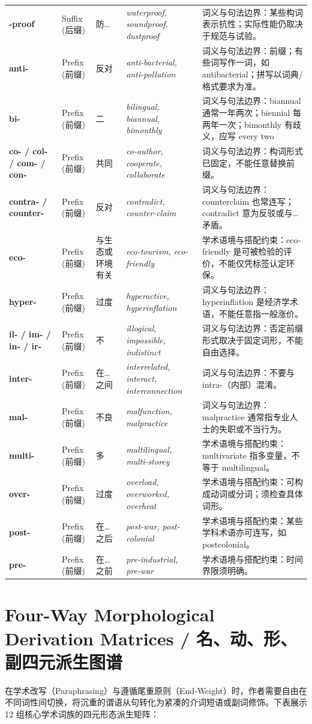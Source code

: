 \begin{longtable}{>{\raggedright\arraybackslash}p{2.2cm}>{\raggedright\arraybackslash}p{2.0cm}>{\raggedright\arraybackslash}p{3.2cm}>{\raggedright\arraybackslash}p{3.4cm}>{\raggedright\arraybackslash}p{3.4cm}}
\textbf{-proof} & Suffix (后缀) & 防… & \textit{waterproof, soundproof, dustproof} & 词义与句法边界：某些构词表示抗性；实际性能仍取决于规范与试验。 \tabularnewline
\textbf{anti-} & Prefix (前缀) & 反对 & \textit{anti-bacterial, anti-pollution} & 词义与句法边界：前缀；有些词写作一词，如 antibacterial；拼写以词典/格式要求为准。 \tabularnewline
\textbf{bi-} & Prefix (前缀) & 二 & \textit{bilingual, biannual, bimonthly} & 词义与句法边界：biannual 通常一年两次；biennial 每两年一次；bimonthly 有歧义，应写 every two \tabularnewline
\textbf{co- / col- / com- / con-} & Prefix (前缀) & 共同 & \textit{co-author, cooperate, collaborate} & 词义与句法边界：构词形式已固定，不能任意替换前缀。 \tabularnewline
\textbf{contra- / counter-} & Prefix (前缀) & 反对 & \textit{contradict, counter-claim} & 词义与句法边界：counterclaim 也常连写；contradict 意为反驳或与…矛盾。 \tabularnewline
\textbf{eco-} & Prefix (前缀) & 与生态或环境有关 & \textit{eco-tourism, eco-friendly} & 学术语境与搭配约束：eco-friendly 是可被检验的评价，不能仅凭标签认定环保。 \tabularnewline
\textbf{hyper-} & Prefix (前缀) & 过度 & \textit{hyperactive, hyperinflation} & 词义与句法边界：hyperinflation 是经济学术语，不能任意指一般涨价。 \tabularnewline
\textbf{il- / im- / in- / ir-} & Prefix (前缀) & 不 & \textit{illogical, impossible, indistinct} & 词义与句法边界：否定前缀形式取决于固定词形，不能自由选择。 \tabularnewline
\textbf{inter-} & Prefix (前缀) & 在…之间 & \textit{interrelated, interact, interconnection} & 词义与句法边界：不要与 intra-（内部）混淆。 \tabularnewline
\textbf{mal-} & Prefix (前缀) & 不良 & \textit{malfunction, malpractice} & 词义与句法边界：malpractice 通常指专业人士的失职或不当行为。 \tabularnewline
\textbf{multi-} & Prefix (前缀) & 多 & \textit{multilingual, multi-storey} & 学术语境与搭配约束：multivariate 指多变量，不等于 multilingual。 \tabularnewline
\textbf{over-} & Prefix (前缀) & 过度 & \textit{overload, overworked, overheat} & 学术语境与搭配约束：可构成动词或分词；须检查具体词形。 \tabularnewline
\textbf{post-} & Prefix (前缀) & 在…之后 & \textit{post-war, post-colonial} & 学术语境与搭配约束：某些学科术语亦可连写，如 postcolonial。 \tabularnewline
\textbf{pre-} & Prefix (前缀) & 在…之前 & \textit{pre-industrial, pre-war} & 学术语境与搭配约束：时间界限须明确。 \tabularnewline
\bottomrule
\end{longtable}
\endgroup

\section{Four-Way Morphological Derivation Matrices / 名、动、形、副四元派生图谱}
在学术改写（Paraphrasing）与遵循尾重原则（End-Weight）时，作者需要自由在不同词性间切换，将沉重的谓语从句转化为紧凑的介词短语或副词修饰。下表展示 12 组核心学术词族的四元形态派生矩阵：

